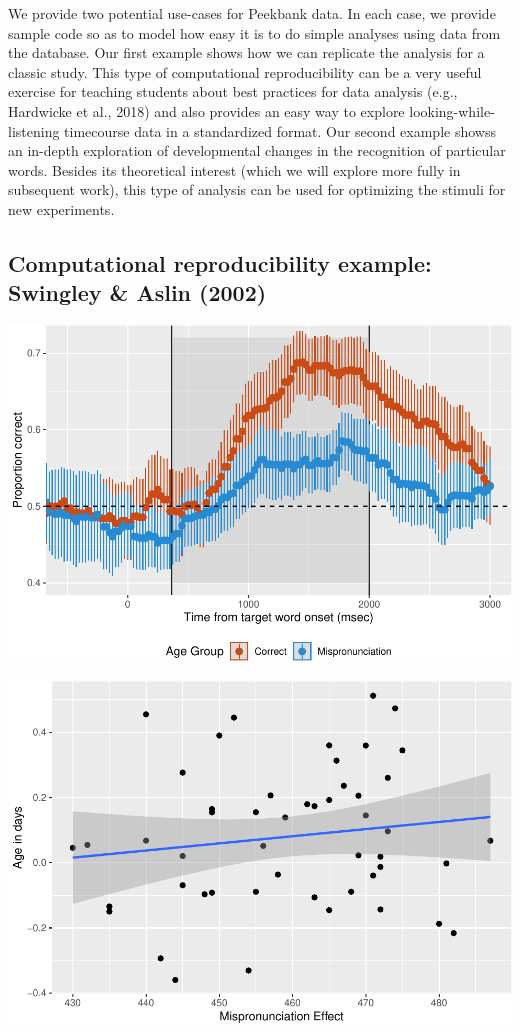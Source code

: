 \documentclass[
  english,
  man,floatsintext]{apa6}
\begin{document}
We provide two potential use-cases for Peekbank data. In each case, we provide sample code so as to model how easy it is to do simple analyses using data from the database. Our first example shows how we can replicate the analysis for a classic study. This type of computational reproducibility can be a very useful exercise for teaching students about best practices for data analysis (e.g., Hardwicke et al., 2018) and also provides an easy way to explore looking-while-listening timecourse data in a standardized format. Our second example showss an in-depth exploration of developmental changes in the recognition of particular words. Besides its theoretical interest (which we will explore more fully in subsequent work), this type of analysis can be used for optimizing the stimuli for new experiments.

\hypertarget{computational-reproducibility-example-swingley-aslin-2002}{%
\subsection{Computational reproducibility example: Swingley \& Aslin (2002)}\label{computational-reproducibility-example-swingley-aslin-2002}}

\includegraphics{peekbank-brm_files/figure-latex/unnamed-chunk-1-1.pdf}

\includegraphics{peekbank-brm_files/figure-latex/unnamed-chunk-2-1.pdf}
\end{document}
